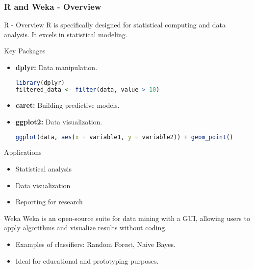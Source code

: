 \documentclass[aspectratio=169]{beamer}
\begin{document}
\begin{frame}[fragile]
    \frametitle{R and Weka - Overview}
    \begin{block}{R - Overview}
        R is specifically designed for statistical computing and data analysis. It excels in statistical modeling.
    \end{block}

    \begin{block}{Key Packages}
        \begin{itemize}
            \item \textbf{dplyr:} Data manipulation.
            \begin{lstlisting}[language=R]
library(dplyr)
filtered_data <- filter(data, value > 10)
            \end{lstlisting}
            \item \textbf{caret:} Building predictive models.
            \item \textbf{ggplot2:} Data visualization.
            \begin{lstlisting}[language=R]
ggplot(data, aes(x = variable1, y = variable2)) + geom_point()
            \end{lstlisting}
        \end{itemize}
    \end{block}

    \begin{block}{Applications}
        \begin{itemize}
            \item Statistical analysis
            \item Data visualization
            \item Reporting for research
        \end{itemize}
    \end{block}

    \begin{block}{Weka}
        Weka is an open-source suite for data mining with a GUI, allowing users to apply algorithms and visualize results without coding.
        \begin{itemize}
            \item Examples of classifiers: Random Forest, Naive Bayes.
            \item Ideal for educational and prototyping purposes.
        \end{itemize}
    \end{block}
\end{frame}
\end{document}
